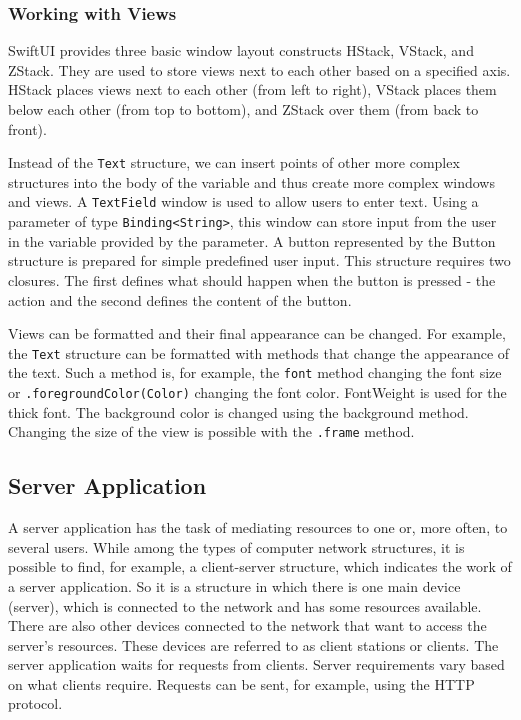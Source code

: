 \documentclass[
  biblatex,
  language=english,
  figures=false,
  sourcecodes,
  glossaries,
  index
]{kidiplom}
\begin{document}
\subsubsection{Working with Views}
SwiftUI provides three basic window layout constructs HStack, VStack, and ZStack. They are used to store views next to each other based on a specified axis. HStack places views next to each other (from left to right), VStack places them below each other (from top to bottom), and ZStack over them (from back to front).

Instead of the \texttt{Text} structure, we can insert points of other more complex structures into the body of the variable and thus create more complex windows and views. A \texttt{TextField} window is used to allow users to enter text. Using a parameter of type \texttt{Binding<String>}, this window can store input from the user in the variable provided by the parameter. A button represented by the Button structure is prepared for simple predefined user input. This structure requires two closures. The first defines what should happen when the button is pressed - the action and the second defines the content of the button.

Views can be formatted and their final appearance can be changed. For example, the \texttt{Text} structure can be formatted with methods that change the appearance of the text. Such a method is, for example, the \texttt{font} method changing the font size or \texttt{.foregroundColor(Color)} changing the font color. FontWeight is used for the thick font. The background color is changed using the background method. Changing the size of the view is possible with the \texttt{.frame} method.

\subsection{Server Application}
A server application has the task of mediating resources to one or, more often, to several users. While among the types of computer network structures, it is possible to find, for example, a client-server structure, which indicates the work of a server application. So it is a structure in which there is one main device (server), which is connected to the network and has some resources available. There are also other devices connected to the network that want to access the server's resources. These devices are referred to as client stations or clients. The server application waits for requests from clients. Server requirements vary based on what clients require. Requests can be sent, for example, using the HTTP protocol.
\end{document}
